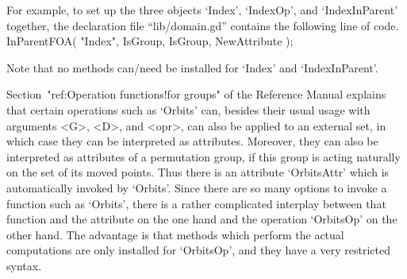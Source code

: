 For example, to set up the three objects `Index', `IndexOp',
and `IndexInParent' together,
the declaration file ``lib/domain.gd'' contains the following line of code.
\begintt
InParentFOA( "Index", IsGroup, IsGroup, NewAttribute );
\endtt

Note that no methods can/need be installed for `Index' and
`IndexInParent'.



Section~"ref:Operation  functions!for  groups"  of  the  Reference Manual
explains that certain operations such as `Orbits' can,
besides their usual usage with arguments <G>, <D>, and <opr>,
can also be applied to an external set,
in which case they can be interpreted as attributes.
Moreover, they can also be interpreted as attributes of a permutation
group, if this group is acting naturally on the set of its moved
points.
Thus there is an attribute `OrbitsAttr' which is automatically
invoked by `Orbits'.
Since there are so many options to invoke a function
such as `Orbits', there is a rather complicated interplay between that
function and the attribute on the one hand and the operation `OrbitsOp'
on the other hand.
The advantage is that methods which perform the actual computations are
only installed for `OrbitsOp',
and they have a very restricted syntax.

